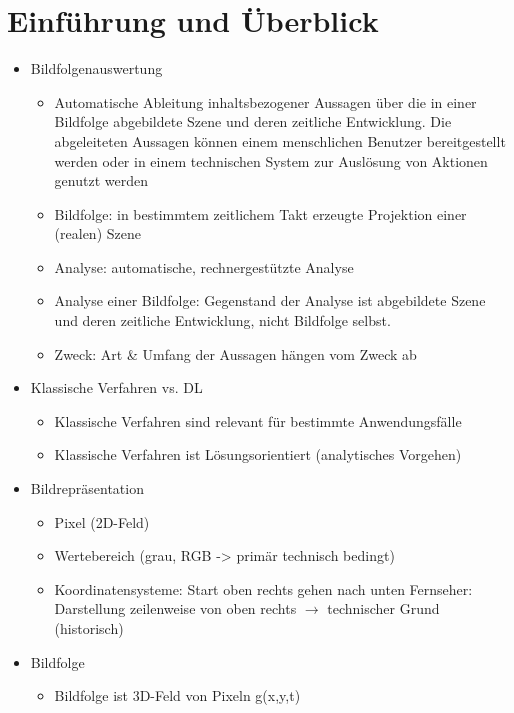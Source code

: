 \documentclass{report}
\begin{document}
	\section{Einführung und Überblick}
	
	\begin{itemize}
		\item Bildfolgenauswertung
		\begin{itemize}
			\item Automatische Ableitung inhaltsbezogener Aussagen über die in einer Bildfolge abgebildete Szene und deren zeitliche Entwicklung. Die abgeleiteten Aussagen können einem menschlichen Benutzer bereitgestellt werden oder in einem technischen System zur Auslösung von Aktionen genutzt werden
			\item Bildfolge: in bestimmtem zeitlichem Takt erzeugte Projektion einer (realen) Szene
			\item Analyse: automatische, rechnergestützte Analyse
			\item Analyse einer Bildfolge: Gegenstand der Analyse ist abgebildete Szene und deren zeitliche Entwicklung, nicht Bildfolge selbst.
			\item Zweck: Art \& Umfang der Aussagen hängen vom Zweck ab
		\end{itemize}
	
		\item Klassische Verfahren vs. DL
		\begin{itemize}
			\item Klassische Verfahren sind relevant für bestimmte Anwendungsfälle
			\item Klassische Verfahren ist Lösungsorientiert (analytisches Vorgehen)
		\end{itemize}
	
		\item Bildrepräsentation
		\begin{itemize}
			\item Pixel (2D-Feld)
			\item Wertebereich (grau, RGB -> primär technisch bedingt)
			\item Koordinatensysteme: Start oben rechts gehen nach unten\newline
			Fernseher: Darstellung zeilenweise von oben rechts $\rightarrow$ technischer Grund (historisch)
		\end{itemize}
		
		\item Bildfolge
		\begin{itemize}
			\item Bildfolge ist 3D-Feld von Pixeln g(x,y,t)
		\end{itemize}
		

\end{itemize}
\end{document}
